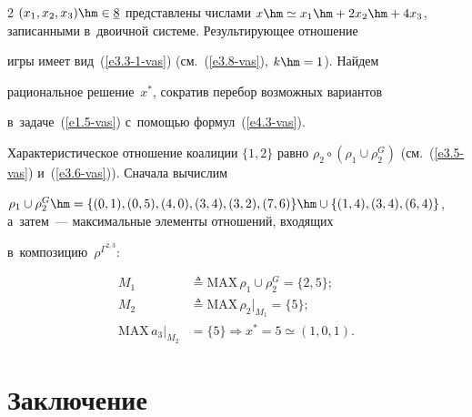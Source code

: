 \begin{multicols}{2}
$(x_1,x_2,x_3)\hm\in \underline{8}$ пред\-став\-ле\-ны чис\-ла\-ми $x\hm\simeq x_1\hm+ 

2x_2\hm+ 4x_3$, записанными в~двоичной сис\-те\-ме. Ре\-зуль\-ти\-ру\-ющее отношение 

игры имеет вид~(\ref{e3.3-1-vas}) (см.~(\ref{e3.8-vas}), $k\hm=1$). Найдем 

рациональное решение~$x^*$, со\-кра\-тив перебор воз\-мож\-ных вариантов 

в~задаче~(\ref{e1.5-vas}) с~по\-мощью формул~(\ref{e4.3-vas}). 

    

    Характеристическое отношение коалиции $\{1,2\}$ равно $\rho_2\circ 

(\rho_1\cup \rho_2^G)$ (см.~(\ref{e3.5-vas}) и~(\ref{e3.6-vas})). Сначала вы\-чис\-лим 

$\rho_1\cup \rho_2^G \hm= \{ (0,1), (0,5), (4,0), (3,4), (3,2),\linebreak (7,6)\} \hm\cup \{ (1,4), (3,4), 

(6,4)\}$, а~затем~--- максимальные элементы отношений, входящих 

в~композицию~$\rho^{\Gamma^{2,3}}$: 



\vspace*{-3pt}



\noindent

     \begin{align*}

     M_1&\triangleq \mathrm{MAX}\, \rho_1\cup \rho_2^G =\{ 2,5\};\\

     M_2&\triangleq \mathrm{MAX}\,\rho_2\vert_{M_1} =\{5\};\\

     \mathrm{MAX}\, a_3\vert_{M_2} &=\{5\}\Rightarrow x^* =5\simeq (1,0,1).

   \end{align*}

   

   \vspace*{-10pt}



\section{Заключение}



\vspace*{-1pt}




\end{multicols}

